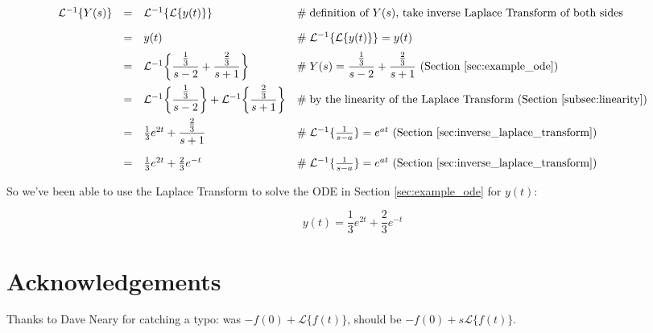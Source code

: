 \documentclass{article}
\theoremstyle{definition}
\begin{document}
\bigskip
\begin{equation*}
\begin{array}{lllll}
\mathcal{L}^{-1}\{Y(s) \}                                                                                                                          
&=& \mathcal{L}^{-1}\{\mathcal{L}\{y(t)\}\}                                                                    &\mathrel{\#} \text{definition of $Y(s)$, take inverse Laplace Transform of both sides}                                         \\
[10pt]
&=& y(t)                                                                                                                        &\mathrel{\#} \mathcal{L}^{-1}\{\mathcal{L}\{y(t)\}\} =y(t)                                                                                          \\
[6pt]
&=& \mathcal{L}^{-1} \bigg \{ \mathlarger{\frac{\frac{1}{3}}{s-2}} + \mathlarger{\frac{\frac{2}{3}}{s+1}} \bigg \}  &\mathrel{\#} \text{$Y(s) = \mathlarger{\frac{\frac{1}{3}}{s-2}} + \mathlarger{\frac{\frac{2}{3}}{s+1}} $ (Section \ref{sec:example_ode})}                                                        \\
[10pt]
&=& \mathcal{L}^{-1}\bigg \{\mathlarger{\frac{\frac{1}{3}}{s-2}} \bigg \} + \mathcal{L}^{-1}\bigg \{ \mathlarger{\frac{\frac{2}{3}}{s+1}} \bigg \} 
                                                                                                                                     &\mathrel{\#} \text{by the linearity of the Laplace Transform (Section \ref{subsec:linearity})}                               \\
[10pt]
&=& \frac{1}{3} e^{2t} + \mathlarger{\frac{\frac{2}{3}}{s+1}}                                         &\mathrel{\#} \text{$\mathcal{L}^{-1} \{ \frac{1}{s-a} \} = e^{at}$ (Section \ref{sec:inverse_laplace_transform})}  \\
[15pt]
&=& \frac{1}{3} e^{2t} + \frac{2}{3} e^{-t}                                                                      &\mathrel{\#} \text{$\mathcal{L}^{-1} \{ \frac{1}{s-a} \} = e^{at}$ (Section \ref{sec:inverse_laplace_transform})} 
\end{array}
\end{equation*}


\bigskip
\noindent
So we've been able to use the Laplace Transform to solve the ODE in Section \ref{sec:example_ode} for $y(t)$:

\bigskip
\begin{equation*}
y(t) = \frac{1}{3} e^{2t} + \frac{2}{3} e^{-t}   
\end{equation*}




\bigskip
\section*{Acknowledgements}
Thanks to Dave Neary for catching a typo: was $-f(0) + \mathcal{L}\{f(t)\}$, should be $-f(0) + s \mathcal{L}\{f(t)\} $.

\newpage


\end{document}
